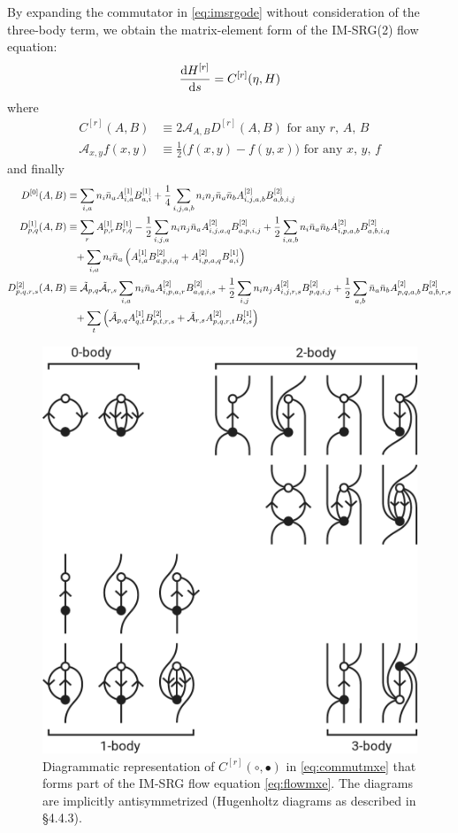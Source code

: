 By expanding the commutator in \eqref{eq:imsrgode} without consideration of the three-body term, we obtain the matrix-element form of the IM-SRG(2) flow equation:
\begin{align}
    \frac{\operatorname{d\!} H^{[r]}}{\operatorname{d\!} s} = C^{[r]}(\eta, H) \label{eq:flowmxe}
\end{align}
where
\begin{align}
  C^{[r]}(A, B) &\equiv 2 \mathcal{A}_{A, B} D^{[r]}(A, B) \text{ for any $r$, $A$, $B$} \label{eq:commutmxe} \\
  \mathcal{A}_{x, y} f(x, y) &\equiv \frac{1}{2} \bigl(f(x, y) - f(y, x)\bigr) \text{ for any $x$, $y$, $f$}
\end{align}
and finally
\begin{align}
  D^{[0]}(A, B)
  &\equiv
    \sum_{i, a} n_i \bar{n}_a A^{[1]}_{i, a} B^{[1]}_{a, i}
    + \frac{1}{4} \sum_{i, j, a, b} n_i n_j \bar{n}_a \bar{n}_b A^{[2]}_{i, j, a, b} B^{[2]}_{a, b, i, j}
    \label{eq:flow0} \\
  D^{[1]}_{p, q}(A, B)
  &\equiv
    \sum_{r} A^{[1]}_{p, r} B^{[1]}_{r, q}
    - \frac{1}{2} \sum_{i, j, a} n_i n_j \bar{n}_a A^{[2]}_{i, j, a, q} B^{[2]}_{a, p, i, j}
    + \frac{1}{2} \sum_{i, a, b} n_i \bar{n}_a \bar{n}_b A^{[2]}_{i, p, a, b} B^{[2]}_{a, b, i, q}
    \notag \\
  &\hphantom{=}
    + \sum_{i, a} n_i \bar{n}_a \left(
    A^{[1]}_{i, a} B^{[2]}_{a, p, i, q}
    + A^{[2]}_{i, p, a, q} B^{[1]}_{a, i}
    \right)
    \label{eq:flow1} \\
  D^{[2]}_{p, q, r, s}(A, B)
  &\equiv
    \tilde{\mathcal{A}}_{p, q} \tilde{\mathcal{A}}_{r, s}
    \sum_{i, a} n_i \bar{n}_a A^{[2]}_{i, p, a, r} B^{[2]}_{a, q, i, s}
    + \frac{1}{2} \sum_{i, j} n_i n_j A^{[2]}_{i, j, r, s} B^{[2]}_{p, q, i, j}
    + \frac{1}{2} \sum_{a, b} \bar{n}_a \bar{n}_b A^{[2]}_{p, q, a, b} B^{[2]}_{a, b, r, s}
    \notag \\
  &\hphantom{=}
    + \sum_{t} \left(
    \tilde{\mathcal{A}}_{p, q} A^{[1]}_{q, t} B^{[2]}_{p, t, r, s}
    + \tilde{\mathcal{A}}_{r, s} A^{[2]}_{p, q, r, t} B^{[1]}_{t, s}
    \right)
    \label{eq:flow2}
\end{align}
\begin{figure}
\includegraphics[width=.48\textwidth]{fig-diagrams-imsrg}
\caption{Diagrammatic representation of $C^{[r]}(\circ, \bullet)$ in \eqref{eq:commutmxe} that forms part of the IM-SRG flow equation \eqref{eq:flowmxe}.  The diagrams are implicitly antisymmetrized (Hugenholtz diagrams \cite{HUGENHOLTZ1957481} as described in \cite{shavitt2009many} \S 4.4.3).}
\label{fig:diagrams-imsrg}
\end{figure}
